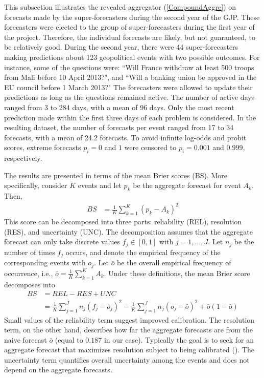\documentclass[12pt]{article}
\theoremstyle{definition}
\theoremstyle{definition}
\begin{document}
This subsection illustrates the revealed aggregator (\ref{CompoundAggre})
on forecasts made by the super-forecasters during the second year of the GJP. These forecasters were
elected to the group of super-forecasters during the first year of the project. 
Therefore, the individual forecasts are
likely, but not guaranteed, to be relatively good. During the second year, there were 44 super-forecasters making predictions about  123 geopolitical events with two possible outcomes. For instance, some of
the questions were: ``Will France withdraw at least 500 troops from Mali before 10 April 2013?", and ``Will a banking union be approved in the EU council before 1 March 2013?"  The forecasters were allowed to update their predictions as long as the
questions remained active. 
The number of active days ranged from 3 to 284 days, with a mean of 96 days. 
Only the most recent prediction made within the first three days of each problem is considered.  
In the resulting
dataset, the number of forecasts per event ranged from 17 to 34
forecasts, with a mean of 24.2 forecasts. To avoid infinite log-odds
and probit scores, extreme forecasts $p_i = 0$ and $1$ were
censored to $p_i = 0.001$ and $0.999$, respectively.
 
 
The results are presented in terms of the mean Brier scores (BS). More specifically, consider $K$
events and let $p_k$ be the aggregate forecast for event $A_k$. Then,
 \begin{align*}
BS &= \frac{1}{K} \sum_{k=1}^K (p_k - A_k)^2
 \end{align*}
 This score can be decomposed into three parts: reliability (REL),
resolution (RES), and uncertainty (UNC). The decomposition assumes
that the aggregate forecast can only take discrete values $f_j \in
[0,1]$ with $j = 1, \dots, J$. Let $n_j$ be the number of times $f_j$
occurs, and denote the empirical frequency of the corresponding events
with $o_j$.  Let $\bar{o}$ be the overall empirical frequency of
occurrence, i.e., $\bar{o} = \frac{1}{K} \sum_{k=1}^K A_k$. Under these definitions, the
mean Brier score decomposes into
 \begin{align*}
BS &= REL - RES + UNC\\
&= \frac{1}{K} \sum_{j=1}^J n_j (f_j - o_j)^2 - \frac{1}{K} \sum_{j=1}^J n_j (o_j - \bar{o})^2 + \bar{o}(1-\bar{o})
 \end{align*}
 Small values of the reliability term suggest improved
calibration. The resolution term, on the other hand, describes how far
the aggregate forecasts are from the naive forecast $\bar{o}$ (equal to $0.187$ in our case). Typically the goal is
to seek for an aggregate forecast that maximizes resolution subject to
being calibrated (\citealt{gneiting2007probabilistic}). The
uncertainty term quantifies overall uncertainty among the events and
does not depend on the aggregate forecasts.
 
\end{document}
